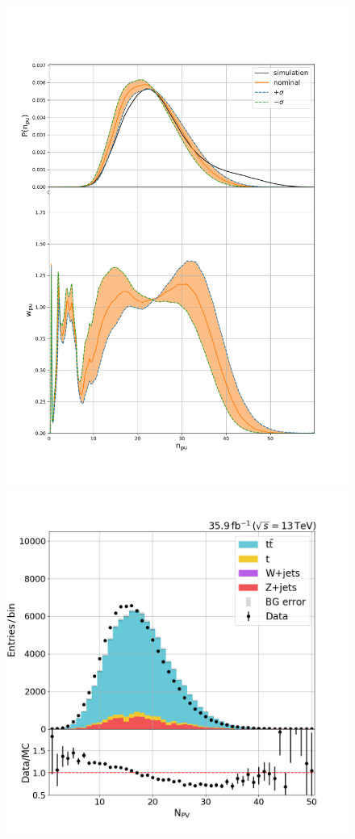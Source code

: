 \begin{figure}[ht]
    \centering
    \includegraphics[height=0.42\textheight]{chapters/Analysis/sectionDataset/figures/pileup_systematics.pdf}
    \includegraphics[height=0.42\textheight]{chapters/Analysis/sectionDataset/figures/n_pv}

\end{figure}
